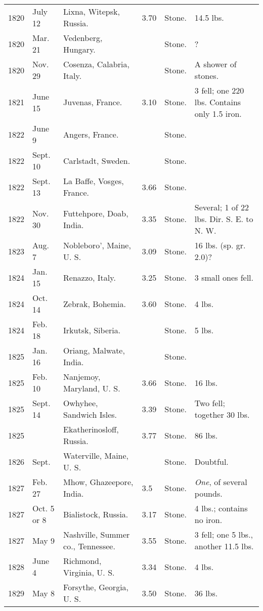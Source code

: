 \documentclass[a4paper, 12pt, oneside]{article}
\begin{document}
\begin{center}
\begin{longtable}{|p{10mm}|p{15mm}|p{32mm}|p{13mm}|p{13mm}|p{26mm}|}
        1820 & July 12 & Lixna, Witepsk, Russia. & 3.70 & Stone. & 14.5 lbs. \\
        1820 & Mar. 21 & Vedenberg, Hungary. & ~ & Stone. & ? \\
        1820 & Nov. 29 & Cosenza, Calabria, Italy. & ~ & Stone. & A shower of stones. \\
        1821 & June 15 & Juvenas, France. & 3.10 & Stone. & 3 fell; one 220 lbs. Contains only 1.5 iron. \\
        1822 & June 9 & Angers, France. & ~ & Stone. & ~ \\
        1822 & Sept. 10 & Carlstadt, Sweden. & ~ & Stone. & ~ \\
        1822 & Sept. 13 & La Baffe, Vosges, France. & 3.66 & Stone. & ~ \\
        1822 & Nov. 30 & Futtehpore, Doab, India. & 3.35 & Stone. & Several; 1 of 22 lbs. Dir. S. E. to N. W. \\
        1823 & Aug. 7 & Nobleboro’, Maine, U. S. & 3.09 & Stone. & 16 lbs. (sp. gr. 2.0)? \\
        1824 & Jan. 15 & Renazzo, Italy. & 3.25 & Stone. & 3 small ones fell. \\
        1824 & Oct. 14 & Zebrak, Bohemia. & 3.60 & Stone. & 4 lbs. \\
        1824 & Feb. 18 & Irkutsk, Siberia. & ~ & Stone. & 5 lbs. \\
        1825 & Jan. 16 & Oriang, Malwate, India. & ~ & Stone. & ~ \\
        1825 & Feb. 10 & Nanjemoy, Maryland, U. S. & 3.66 & Stone. & 16 lbs. \\
        1825 & Sept. 14 & Owhyhee, Sandwich Isles. & 3.39 & Stone. & Two fell; together 30 lbs. \\
        1825 & ~ & Ekatherinosloff, Russia. & 3.77 & Stone. & 86 lbs. \\
        1826 & Sept. & Waterville, Maine, U. S. & ~ & Stone. & Doubtful. \\
        1827 & Feb. 27 & Mhow, Ghazeepore, India. & 3.5 & Stone. & \emph{One}, of several pounds. \\
        1827 & Oct. 5 or 8 & Bialistock, Russia. & 3.17 & Stone. & 4 lbs.; contains no iron. \\
        1827 & May 9 & Nashville, Summer co., Tennessee. & 3.55 & Stone. & 3 fell; one 5 lbs., another 11.5 lbs. \\
        1828 & June 4 & Richmond, Virginia, U. S. & 3.34 & Stone. & 4 lbs. \\
        1829 & May 8 & Forsythe, Georgia, U. S. & 3.50 & Stone. & 36 lbs. \\

\end{longtable}
\end{center}
\end{document}
